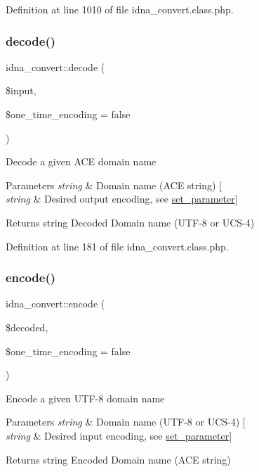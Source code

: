 Definition at line 1010 of file idna\+\_\+convert.\+class.\+php.

\mbox{\label{classidna__convert_a845094b11b91976cea00bd9b9e022cd5}} 
\subsubsection{\texorpdfstring{decode()}{decode()}}
{\footnotesize\ttfamily idna\+\_\+convert\+::decode (\begin{DoxyParamCaption}\item[{}]{\$input,  }\item[{}]{\$one\+\_\+time\+\_\+encoding = {\ttfamily false} }\end{DoxyParamCaption})}

Decode a given A\+CE domain name 
\begin{DoxyParams}{Parameters}
{\em string} & Domain name (A\+CE string) \mbox{[}\\
\hline
{\em string} & Desired output encoding, see \hyperlink{classidna__convert_a1efc37a8bd5f6b08eed75e0b8e6f074d}{set\+\_\+parameter}\mbox{]} \\
\hline
\end{DoxyParams}
\begin{DoxyReturn}{Returns}
string Decoded Domain name (U\+T\+F-\/8 or U\+C\+S-\/4) 
\end{DoxyReturn}


Definition at line 181 of file idna\+\_\+convert.\+class.\+php.

\mbox{\label{classidna__convert_ae6e83c86d02d1ad9b8a7eb48435863bd}} 
\subsubsection{\texorpdfstring{encode()}{encode()}}
{\footnotesize\ttfamily idna\+\_\+convert\+::encode (\begin{DoxyParamCaption}\item[{}]{\$decoded,  }\item[{}]{\$one\+\_\+time\+\_\+encoding = {\ttfamily false} }\end{DoxyParamCaption})}

Encode a given U\+T\+F-\/8 domain name 
\begin{DoxyParams}{Parameters}
{\em string} & Domain name (U\+T\+F-\/8 or U\+C\+S-\/4) \mbox{[}\\
\hline
{\em string} & Desired input encoding, see \hyperlink{classidna__convert_a1efc37a8bd5f6b08eed75e0b8e6f074d}{set\+\_\+parameter}\mbox{]} \\
\hline
\end{DoxyParams}
\begin{DoxyReturn}{Returns}
string Encoded Domain name (A\+CE string) 
\end{DoxyReturn}



